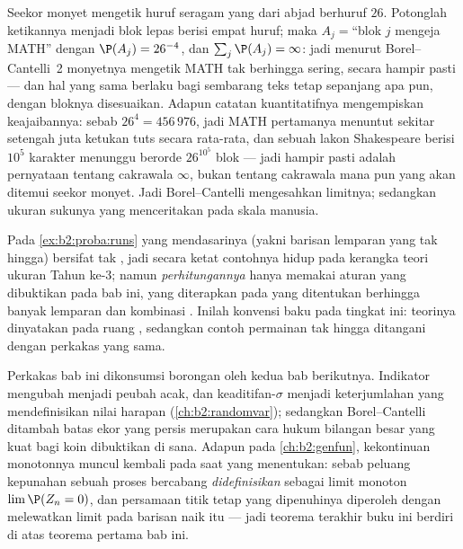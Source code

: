 \begin{example}
Seekor monyet mengetik huruf seragam yang  dari abjad
berhuruf $26$. Potonglah ketikannya menjadi blok lepas
berisi empat huruf; maka  $A_j = {}$``blok $j$ mengeja
MATH''  dengan $\P(A_j) = 26^{-4}$, dan
$\sum_j\P(A_j) = \infty$: jadi menurut Borel--Cantelli~2 monyetnya
mengetik MATH tak berhingga sering, secara hampir pasti --- dan hal yang sama
berlaku bagi sembarang teks tetap sepanjang apa pun, dengan bloknya disesuaikan.
Adapun catatan kuantitatifnya mengempiskan keajaibannya: sebab $26^4 =
456\,976$, jadi MATH pertamanya menuntut sekitar setengah juta
ketukan tuts secara rata-rata, dan sebuah lakon Shakespeare berisi $10^5$
karakter menunggu berorde $26^{10^5}$ blok --- jadi hampir pasti
adalah pernyataan tentang cakrawala $\infty$, bukan tentang cakrawala
mana pun yang akan ditemui seekor monyet. Jadi Borel--Cantelli mengesahkan
limitnya; sedangkan ukuran sukunya yang menceritakan pada skala manusia.
\end{example}

\begin{remark}
Pada \cref{ex:b2:proba:runs}  yang mendasarinya (yakni barisan
lemparan yang tak hingga) bersifat tak , jadi secara ketat
contohnya hidup pada kerangka teori ukuran Tahun ke-3; namun
\emph{perhitungannya} hanya memakai aturan yang dibuktikan pada bab
ini, yang diterapkan pada  yang ditentukan berhingga banyak lemparan dan
kombinasi . Inilah konvensi baku pada tingkat ini:
teorinya dinyatakan pada ruang , sedangkan contoh permainan
tak hingga ditangani dengan perkakas yang sama.
\end{remark}

\begin{remark}
Perkakas bab ini dikonsumsi borongan oleh kedua bab
berikutnya. Indikator mengubah  menjadi peubah acak, dan
keaditifan-$\sigma$ menjadi keterjumlahan yang mendefinisikan
nilai harapan (\cref{ch:b2:randomvar}); sedangkan Borel--Cantelli ditambah
batas ekor yang  persis merupakan cara hukum bilangan besar
yang kuat bagi koin dibuktikan di sana. Adapun pada
\cref{ch:b2:genfun}, kekontinuan monotonnya muncul kembali pada saat
yang menentukan: sebab peluang kepunahan sebuah proses bercabang
\emph{didefinisikan} sebagai limit monoton
$\lim\P(Z_n = 0)$, dan persamaan titik tetap yang dipenuhinya
diperoleh dengan melewatkan limit pada barisan naik itu ---
jadi teorema terakhir buku ini berdiri di atas teorema pertama bab ini.
\end{remark}

